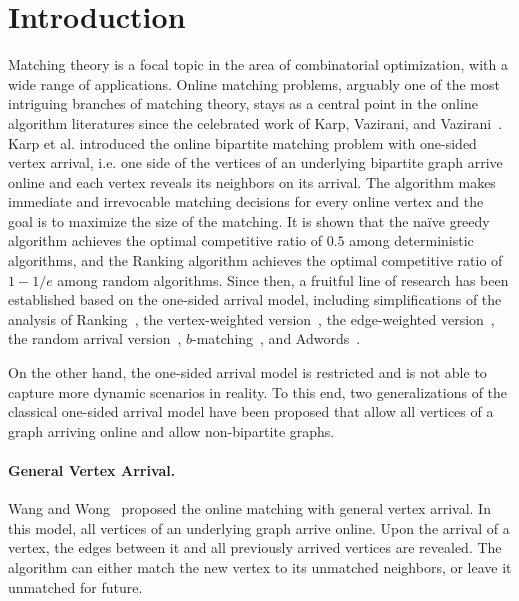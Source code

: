 \section{Introduction}
\label{sec:intro}
Matching theory is a focal topic in the area of combinatorial optimization, with a wide range of applications. %
Online matching problems, arguably one of the most intriguing branches of matching theory, stays as a central point in the online algorithm literatures since the celebrated work of Karp, Vazirani, and Vazirani~\cite{stoc/KarpVV90}.
Karp et al. introduced the online bipartite matching problem with one-sided vertex arrival, i.e. one side of the vertices of an underlying bipartite graph arrive online and each vertex reveals its neighbors on its arrival. The algorithm makes immediate and irrevocable matching decisions for every online vertex and the goal is to maximize the size of the matching. It is shown that the na\"ive greedy algorithm achieves the optimal competitive ratio of $0.5$ among deterministic algorithms, and the Ranking algorithm achieves the optimal competitive ratio of $1-1/e$ among random algorithms. 
Since then, a fruitful line of research has been established based on the one-sided arrival model, including simplifications of the analysis of Ranking~\cite{soda/GoelM08,sigact/BenjaminM08,soda/DevanurJK13}, the vertex-weighted version~\cite{soda/AggarwalGKM11,talg/HuangTWZ19}, the edge-weighted version~\cite{teco/DevanurHKMY16, fahrbach2020edge, wine/FeldmanKMMP09, wine/KorulaMZ13,gao2021improved,blanc2021multiway}, the random arrival version~\cite{stoc/MahdianY11,stoc/KarandeMT11}, $b$-matching~\cite{tcs/KalyanasundaramP00}, and Adwords~\cite{jacm/MehtaSVV07, esa/BuchbinderJN07, stoc/DevanurJ12, focs/HuangZZ20}.


On the other hand, the one-sided arrival model is restricted and is not able to capture more dynamic scenarios in reality. To this end, two generalizations of the classical one-sided arrival model have been proposed that allow all vertices of a graph arriving online and allow non-bipartite graphs.


\paragraph{General Vertex Arrival.}
Wang and Wong~\cite{icalp/WangW15} proposed the online matching with general vertex arrival.
In this model, all vertices of an underlying graph arrive online. Upon the arrival of a vertex, the edges between it and all previously arrived vertices are revealed. The algorithm can either match the new vertex to its unmatched neighbors, or leave it unmatched for future.

